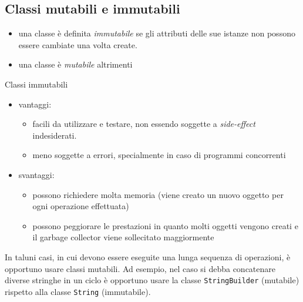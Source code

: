 \documentclass{article}
\begin{document}
\subsection{Classi mutabili e immutabili}
\begin{itemize}
\item una classe è definita \emph{immutabile} se gli attributi delle sue istanze non possono essere cambiate una volta create.
\item una classe è \emph{mutabile} altrimenti
\end{itemize}

Classi immutabili
\begin{itemize}
\item vantaggi:
\begin{itemize}
\item facili da utilizzare e testare, non essendo soggette a \emph{side-effect} indesiderati.
\item meno soggette a errori, specialmente in caso di programmi concorrenti
\end{itemize}
\item svantaggi:
\begin{itemize}
\item possono richiedere molta memoria (viene creato un nuovo oggetto per ogni operazione effettuata)
\item possono peggiorare le prestazioni in quanto molti oggetti vengono creati e il garbage collector viene sollecitato maggiormente
\end{itemize}
\end{itemize}

In taluni casi, in cui devono essere eseguite una lunga sequenza di operazioni, è opportuno usare classi mutabili.
Ad esempio, nel caso si debba concatenare diverse stringhe in un ciclo è opportuno usare la classe
\texttt{StringBuilder} (mutabile) rispetto alla classe \texttt{String} (immutabile).
\end{document}
